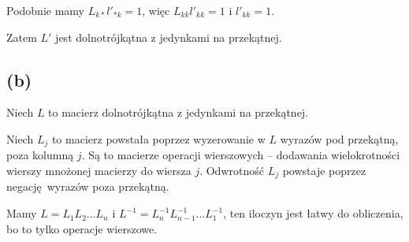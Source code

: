 \documentclass[a4paper, 12pt]{article}
\newcommand{\+}{\enspace}
\begin{document}
Podobnie mamy $L_{k*} l'_{*k} = 1$, więc $L_{kk} l'_{kk} = 1$ i $l'_{kk} = 1$.

Zatem $L'$ jest dolnotrójkątna z jedynkami na przekątnej.

\subsection*{(b)}
Niech $L$ to macierz dolnotrójkątna z jedynkami na przekątnej.

Niech $L_j$ to macierz powstała poprzez wyzerowanie w $L$ wyrazów
pod przekątną, poza kolumną $j$.
Są to macierze operacji wierszowych --
dodawania wielokrotności wierszy mnożonej macierzy do wiersza $j$.
Odwrotność $L_j$ powstaje poprzez negację wyrazów poza przekątną.

Mamy $L = L_1 L_2 … L_n$ i $L^{-1} = L_n^{-1} L_{n-1}^{-1} … L_1^{-1}$,
ten iloczyn jest łatwy do obliczenia, bo to tylko operacje wierszowe.
\end{document}
